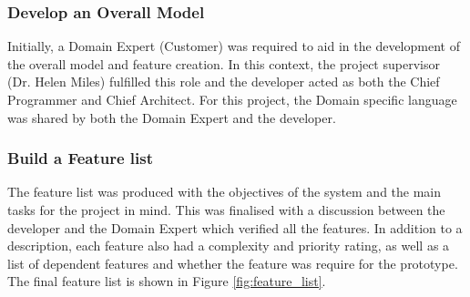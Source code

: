 \subsubsection{Develop an Overall Model}
Initially, a Domain Expert (Customer) was required to aid in the development of the overall model and feature creation. In this context, the project supervisor (Dr. Helen Miles) fulfilled this role and the developer acted as both the Chief Programmer and Chief Architect. For this project, the Domain specific language was shared by both the Domain Expert and the developer.

\subsubsection{Build a Feature list}
The feature list was produced with the objectives of the system and  the main tasks for the project in mind. This was finalised with a discussion between the developer and the Domain Expert which verified all the features. In addition to a description, each feature also had a complexity and priority rating, as well as a list of dependent features and whether the feature was require for the prototype. The final feature list is shown in Figure \ref{fig:feature_list}.

\begin{figure}[h!]
\end{figure}

